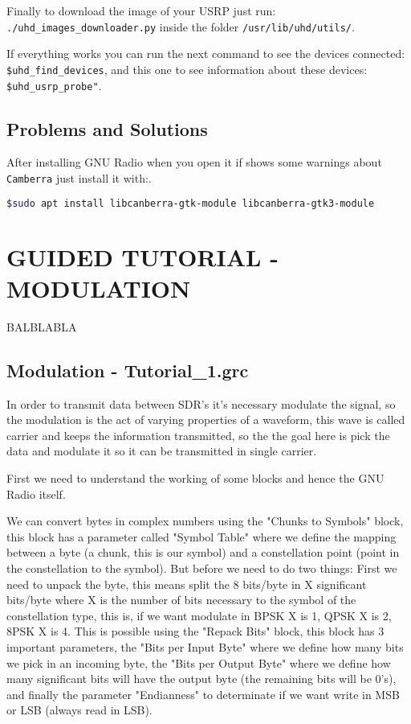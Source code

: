 \documentclass[a4paper, 10pt, conference]{ieeeconf}      %
\begin{document}
Finally to download the image of your USRP just run: 
\verb|./uhd_images_downloader.py| inside the folder \verb|/usr/lib/uhd/utils/|.

If everything works you can run the next command to see the devices connected:
\verb|$uhd_find_devices|, and this one to see information about these devices: \verb|$uhd_usrp_probe"|.

\subsection{Problems and Solutions}
After installing GNU Radio when you open it if shows some warnings about \verb|Camberra| just install it with:.
\begin{lstlisting}[language=bash, breaklines]
$sudo apt install libcanberra-gtk-module libcanberra-gtk3-module
\end{lstlisting}


\section{GUIDED TUTORIAL - MODULATION}

BALBLABLA

\subsection{Modulation - Tutorial\_1.grc}
    In order to transmit data between SDR's it's necessary modulate the signal, so the modulation is the act of varying properties of a waveform, this wave is called carrier and keeps the information transmitted, so the the goal here is pick the data and modulate it so it can be transmitted in single carrier.
    
    First we need to understand the working of some blocks and hence the GNU Radio itself. 
    
    
    We can convert bytes in complex numbers using the "Chunks to Symbols" block, this block has a parameter called "Symbol Table" where we define the mapping between a byte (a chunk, this is our symbol) and a constellation point (point in the constellation to the symbol). But before we need to do two things:
        First we need to unpack the byte, this means split the 8 bits/byte in X significant bits/byte where X is the number of bits necessary to the symbol of the constellation type, this is, if we want modulate in BPSK X is 1, QPSK X is 2, 8PSK X is 4.
        This is possible using the "Repack Bits" block, this block has 3 important parameters, the "Bits per Input Byte" where we define how many bits we pick in an incoming byte, the "Bits per Output Byte" where we define how many significant bits will have the output byte (the remaining bits will be 0's), and finally the parameter "Endianness" to determinate if we want write in MSB or LSB (always read in LSB). 
    
\end{document}
